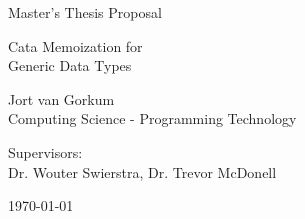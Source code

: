 \begin{titlepage}
  \fontsize{12pt}{15pt}\selectfont
  \begin{center}
    \vspace*{4cm}

    Master's Thesis Proposal

    \vspace{0.5cm}

    {
      \fontsize{20.74pt}{20.74pt}\selectfont
      \parbox[]{13cm} {
        \centering
        Cata Memoization for \\ Generic Data Types
      }
    }
      
    \vspace{1.25cm}
    
    Jort van Gorkum\\
    Computing Science - Programming Technology\\
    
    \vspace{1.25cm}
    
    Supervisors: \\
    Dr. Wouter Swierstra, Dr. Trevor McDonell\\
    
    \vspace{1cm}

    \today
  \end{center}
\end{titlepage}